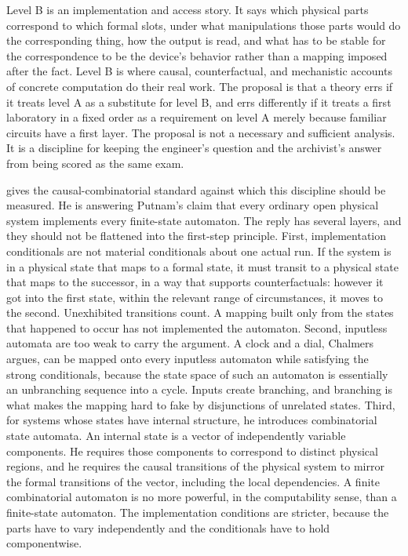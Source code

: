 \documentclass[11pt]{article}
\begin{document}
Level B is an implementation and access story. It says which physical parts correspond to which formal slots, under what manipulations those parts would do the corresponding thing, how the output is read, and what has to be stable for the correspondence to be the device’s behavior rather than a mapping imposed after the fact. Level B is where causal, counterfactual, and mechanistic accounts of concrete computation do their real work. The proposal is that a theory errs if it treats level A as a substitute for level B, and errs differently if it treats a first laboratory in a fixed order as a requirement on level A merely because familiar circuits have a first layer. The proposal is not a necessary and sufficient analysis. It is a discipline for keeping the engineer’s question and the archivist’s answer from being scored as the same exam.

\citet{chalmers1996} gives the causal-combinatorial standard against which this discipline should be measured. He is answering Putnam’s claim that every ordinary open physical system implements every finite-state automaton. The reply has several layers, and they should not be flattened into the first-step principle. First, implementation conditionals are not material conditionals about one actual run. If the system is in a physical state that maps to a formal state, it must transit to a physical state that maps to the successor, in a way that supports counterfactuals: however it got into the first state, within the relevant range of circumstances, it moves to the second. Unexhibited transitions count. A mapping built only from the states that happened to occur has not implemented the automaton. Second, inputless automata are too weak to carry the argument. A clock and a dial, Chalmers argues, can be mapped onto every inputless automaton while satisfying the strong conditionals, because the state space of such an automaton is essentially an unbranching sequence into a cycle. Inputs create branching, and branching is what makes the mapping hard to fake by disjunctions of unrelated states. Third, for systems whose states have internal structure, he introduces combinatorial state automata. An internal state is a vector of independently variable components. He requires those components to correspond to distinct physical regions, and he requires the causal transitions of the physical system to mirror the formal transitions of the vector, including the local dependencies. A finite combinatorial automaton is no more powerful, in the computability sense, than a finite-state automaton. The implementation conditions are stricter, because the parts have to vary independently and the conditionals have to hold componentwise.
\end{document}
